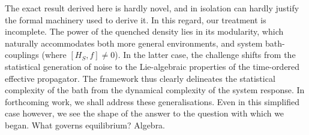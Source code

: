\documentclass[aps,prl,twocolumn,superscriptaddress,showpacs,floatfix]{revtex4-2}
\begin{document}
The exact result derived here is hardly novel, and in isolation can hardly justify the formal machinery used to derive it. In this regard, our treatment is incomplete. The power of the quenched density lies in its modularity, which naturally accommodates both more general environments, and system bath-couplings (where $[H_S, f] \neq 0$). In the latter case, the challenge shifts from the statistical generation of noise to the Lie-algebraic properties of the time-ordered effective propagator. The framework thus clearly delineates the statistical complexity of the bath from the dynamical complexity of the system response. In forthcoming work, we shall address these generalisations. Even in this simplified case however, we see the shape of the answer to the question with which we began. What governs equilibrium? Algebra. 
 


\end{document}
